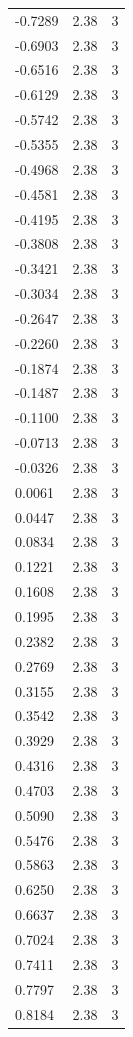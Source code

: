 \begin{longtable}{lrr}
  -0.7289 & 2.38 & 3 \\
  -0.6903 & 2.38 & 3 \\
  -0.6516 & 2.38 & 3 \\
  -0.6129 & 2.38 & 3 \\
  -0.5742 & 2.38 & 3 \\
  -0.5355 & 2.38 & 3 \\
  -0.4968 & 2.38 & 3 \\
  -0.4581 & 2.38 & 3 \\
  -0.4195 & 2.38 & 3 \\
  -0.3808 & 2.38 & 3 \\
  -0.3421 & 2.38 & 3 \\
  -0.3034 & 2.38 & 3 \\
  -0.2647 & 2.38 & 3 \\
  -0.2260 & 2.38 & 3 \\
  -0.1874 & 2.38 & 3 \\
  -0.1487 & 2.38 & 3 \\
  -0.1100 & 2.38 & 3 \\
  -0.0713 & 2.38 & 3 \\
  -0.0326 & 2.38 & 3 \\
  0.0061 & 2.38 & 3 \\
  0.0447 & 2.38 & 3 \\
  0.0834 & 2.38 & 3 \\
  0.1221 & 2.38 & 3 \\
  0.1608 & 2.38 & 3 \\
  0.1995 & 2.38 & 3 \\
  0.2382 & 2.38 & 3 \\
  0.2769 & 2.38 & 3 \\
  0.3155 & 2.38 & 3 \\
  0.3542 & 2.38 & 3 \\
  0.3929 & 2.38 & 3 \\
  0.4316 & 2.38 & 3 \\
  0.4703 & 2.38 & 3 \\
  0.5090 & 2.38 & 3 \\
  0.5476 & 2.38 & 3 \\
  0.5863 & 2.38 & 3 \\
  0.6250 & 2.38 & 3 \\
  0.6637 & 2.38 & 3 \\
  0.7024 & 2.38 & 3 \\
  0.7411 & 2.38 & 3 \\
  0.7797 & 2.38 & 3 \\
  0.8184 & 2.38 & 3 \\

\end{longtable}
